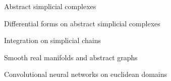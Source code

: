 \documentclass[../main.tex]{subfiles}
\begin{document}
\begin{subsection}{Abstract simplicial complexes}
        
\end{subsection}
\begin{subsection}{Differential forms on abstract simplicial complexes}
        
\end{subsection}
\begin{subsection}{Integration on simplicial chains}
    
\end{subsection}
\begin{subsection}{Smooth real manifolds and abstract graphs}
    
\end{subsection}
\begin{subsection}{Convolutional neural networks on euclidean domains}
    
\end{subsection}
\end{document}
